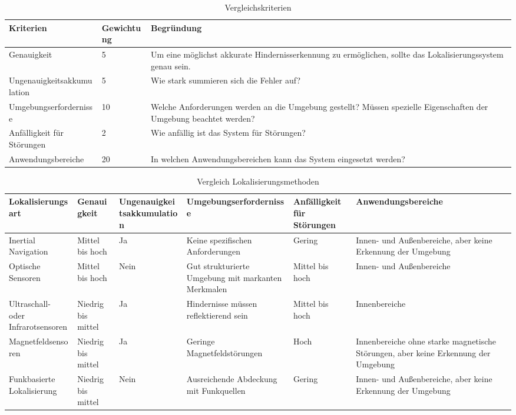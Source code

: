 \begin{table}[H]
    \centering
    \begin{tabular}{|p{5cm}|p{5cm}|p{5cm}|}
        \hline
        \textbf{Kriterien} & \textbf{Gewichtung} & \textbf{Begründung} \\
        \hline
        Genauigkeit & 5 & Um eine möglichst akkurate Hindernisserkennung zu ermöglichen, sollte das Lokalisierungssystem genau sein. \\
        \hline
        Ungenauigkeitsakkumulation & 5 & Wie stark summieren sich die Fehler auf? \\
        \hline
        Umgebungserfordernisse & 10 & Welche Anforderungen werden an die Umgebung gestellt? Müssen spezielle Eigenschaften der Umgebung beachtet werden? \\
        \hline
        Anfälligkeit für Störungen & 2 & Wie anfällig ist das System für Störungen? \\
        \hline
        Anwendungsbereiche & 20 & In welchen Anwendungsbereichen kann das System eingesetzt werden? \\
        \hline
    \end{tabular}
    \caption{Vergleichskriterien}
    \label{tab:vergleich-kriterien}
\end{table}

\begin{table}[H]
\begin{center}
   \fontsize{7}{11}\selectfont
    \begin{tabular}{|p{2cm}|p{2cm}|p{2cm}|p{3cm}|p{2cm}|p{3cm}|}
    \hline
    \textbf{Lokalisier\-ungsart} & \textbf{Genauigkeit} & \textbf{Ungenauigkeits\-akkumulation} & \textbf{Umgebungs\-erfordernisse} & \textbf{Anfälligkeit für Störungen} & \textbf{Anwendungsbereiche} \\\hline
    Inertial Navigation & Mittel bis hoch & Ja & Keine spezifischen Anforderungen & Gering & Innen- und Außenbereiche, aber keine Erkennung der Umgebung \\\hline
    Optische Sensoren & Mittel bis hoch & Nein & Gut strukturierte Umgebung mit markanten Merkmalen & Mittel bis hoch & Innen- und Außenbereiche \\\hline
    Ultraschall- oder Infrarotsensoren & Niedrig bis mittel & Ja & Hindernisse müssen reflektierend sein & Mittel bis hoch & Innenbereiche \\\hline
    Magnetfeld\-sensoren & Niedrig bis mittel & Ja & Geringe Magnetfeldstörungen & Hoch & Innenbereiche ohne starke magnetische Störungen, aber keine Erkennung der Umgebung \\\hline
    Funkbasierte Lokalisierung & Niedrig bis mittel & Nein & Ausreichende Abdeckung mit Funkquellen & Gering & Innen- und Außenbereiche, aber keine Erkennung der Umgebung \\\hline
    \end{tabular}
    \caption{Vergleich Lokalisierungsmethoden}\label{tab:vergleich}
    \end{center}
\end{table}

